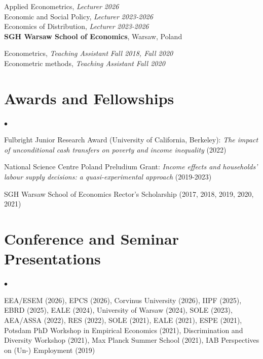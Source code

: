 \documentclass[margin,line]{res}
\newenvironment{list2}{
  \begin{list}{$\bullet$}{%
      \setlength{\itemsep}{0in}
      \setlength{\parsep}{0in} \setlength{\parskip}{0in}
      \setlength{\topsep}{0in} \setlength{\partopsep}{0in} 
      \setlength{\leftmargin}{0.2in}}}{\end{list}}
\begin{document}
\begin{resume}
\vspace{-.3cm}
Applied Econometrics, \textit{Lecturer} \hfill \textit{2026}\\
Economic and Social Policy, \textit{Lecturer} \hfill \textit{2023-2026}\\
Economics of Distribution, \textit{Lecturer} \hfill \textit{2023-2026}\\

{\bf SGH Warsaw School of Economics}, Warsaw, Poland

\vspace{-.3cm}
Econometrics, \textit{Teaching Assistant} \hfill \textit{Fall 2018, Fall 2020}\\
Econometric methods, \textit{Teaching Assistant} \hfill \textit{Fall 2020}\\

\vspace*{.05in}  
\section{\sc Awards and Fellowships} 
\begin{list2}
\item Fulbright Junior Research Award (University of California, Berkeley): \textit{The impact of unconditional cash transfers on poverty and income inequality} (2022)
\item National Science Centre Poland Preludium Grant: \textit{Income effects and households' labour supply decisions: a quasi-experimental approach} (2019-2023)
\item SGH Warsaw School of Economics Rector's Scholarship (2017, 2018, 2019, 2020, 2021)
\end{list2}
\vspace*{.05in} 
\section{\sc Conference and Seminar Presentations} 
\begin{list2}
	\item EEA/ESEM (2026), EPCS (2026), Corvinus University (2026), IIPF (2025), EBRD (2025), EALE (2024), University of Warsaw (2024), SOLE (2023), AEA/ASSA (2022), RES (2022), SOLE (2021), EALE (2021), ESPE (2021), Potsdam PhD Workshop in Empirical Economics (2021), Discrimination and Diversity Workshop (2021), Max Planck Summer School (2021), IAB Perspectives on (Un-) Employment (2019)
\end{list2}
\vspace*{.05in} 

\end{resume}
\end{document}
